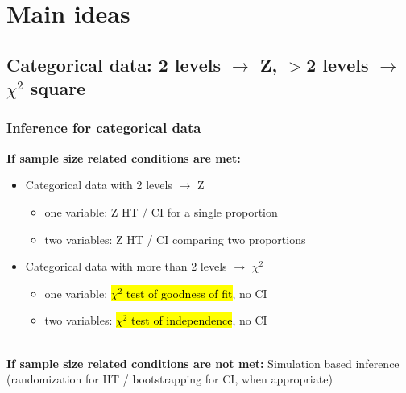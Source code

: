 \documentclass[slidestop,compress,mathserif,12pt,t,professionalfonts,xcolor=table]{beamer}
\begin{document}

\section{Main ideas}


\subsection{Categorical data: 2 levels $\rightarrow$ Z, $>$2 levels $\rightarrow$ $\chi^2$ square}
\label{mi1}


\begin{frame}
\frametitle{Inference for categorical data}

\textbf{If sample size related conditions are met:}

\pause

\begin{itemize}

\item Categorical data with 2 levels $\rightarrow$ Z

\pause

\begin{itemize}
\item one variable: Z HT  / CI for a single proportion
\item two variables: Z HT  / CI  comparing two proportions
\end{itemize} 

\pause

\item Categorical data with more than 2 levels $\rightarrow$ $\chi^2$

\pause

\begin{itemize}
\item one variable: \hl{$\chi^2$ test of goodness of fit}, no CI
\item two variables: \hl{$\chi^2$ test of independence}, no CI
\end{itemize} 

\end{itemize}

\pause
$\:$ \\

\textbf{If sample size related conditions are not met:} \pause Simulation based inference (randomization for HT / bootstrapping for CI, when appropriate)

\end{frame}
\end{document}
